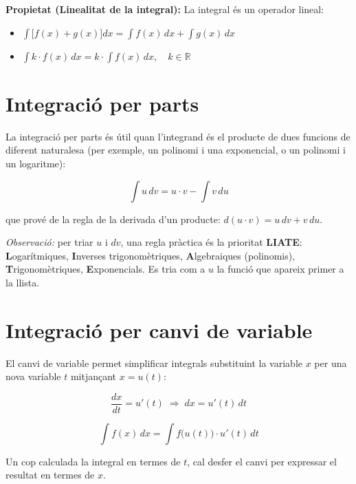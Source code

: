 \textbf{Propietat (Linealitat de la integral):} La integral és un operador lineal:

\begin{itemize}
\item $\displaystyle\int \bigl[f(x) + g(x)\bigr]dx = \int f(x)\,dx + \int g(x)\,dx$
\item $\displaystyle\int k\cdot f(x)\,dx = k\cdot\int f(x)\,dx, \quad k\in\mathbb{R}$
\end{itemize}

\section{Integració per parts}

La integració per parts és útil quan l'integrand és el producte de dues funcions de diferent naturalesa (per exemple, un polinomi i una exponencial, o un polinomi i un logaritme):

\begin{equation*}
\int u\,dv = u\cdot v - \int v\,du
\end{equation*}

que prové de la regla de la derivada d'un producte: $d(u\cdot v) = u\,dv + v\,du$.

\emph{Observació:} per triar $u$ i $dv$, una regla pràctica és la prioritat \textbf{LIATE}: \textbf{L}ogarítmiques, \textbf{I}nverses trigonomètriques, \textbf{A}lgebraiques (polinomis), \textbf{T}rigonomètriques, \textbf{E}xponencials. Es tria com a $u$ la funció que apareix primer a la llista.

\section{Integració per canvi de variable}

El canvi de variable permet simplificar integrals substituint la variable $x$ per una nova variable $t$ mitjançant $x = u(t)$:

\begin{equation*}
\frac{dx}{dt} = u'(t) \;\Rightarrow\; dx = u'(t)\,dt
\end{equation*}

\begin{equation*}
\int f(x)\,dx = \int f\bigl(u(t)\bigr)\cdot u'(t)\,dt
\end{equation*}

Un cop calculada la integral en termes de $t$, cal desfer el canvi per expressar el resultat en termes de $x$.

